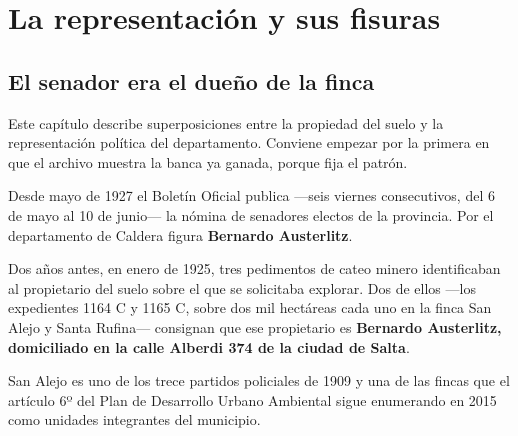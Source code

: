 \chapter{La representación y sus fisuras}


\label{cap:politica}
\section{El senador era el dueño de la finca}

Este capítulo describe superposiciones entre la propiedad del suelo y la representación
política del departamento. Conviene empezar por la primera en que el archivo muestra la banca ya ganada, porque
fija el patrón.

Desde mayo de 1927 el Boletín Oficial publica —seis viernes consecutivos, del 6 de mayo al 10 de junio— la nómina de
senadores electos de la provincia. Por el departamento de Caldera figura \textbf{Bernardo
Austerlitz}.

Dos años antes, en enero de 1925, tres pedimentos de cateo minero identificaban al
propietario del suelo sobre el que se solicitaba explorar. Dos de ellos —los expedientes
1164 C y 1165 C, sobre dos mil hectáreas cada uno en la finca San Alejo y Santa Rufina—
consignan que ese propietario es \textbf{Bernardo Austerlitz, domiciliado en la calle
Alberdi 374 de la ciudad de Salta}.

San Alejo es uno de los trece partidos policiales de 1909 y una de las fincas que el
artículo 6º del Plan de Desarrollo Urbano Ambiental sigue enumerando en 2015 como unidades
integrantes del municipio.

